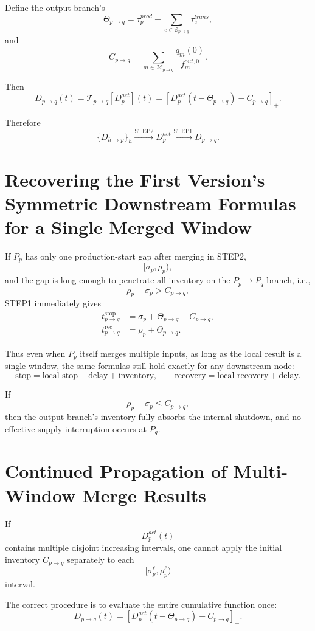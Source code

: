 \documentclass[11pt]{article}
\begin{document}
Define the output branch's
\[
\Theta_{p\to q}
=
\tau_p^{prod}
+
\sum_{e\in\mathcal E_{p\to q}}
\tau_e^{trans},
\]
and
\[
C_{p\to q}
=
\sum_{m\in\mathcal M_{p\to q}}
\frac{q_m(0)}{f_m^{out,0}}.
\]

Then
\[
\boxed{
D_{p\to q}(t)
=
\mathcal T_{p\to q}[D_p^{act}](t)
=
\left[
D_p^{act}(t-\Theta_{p\to q})
-
C_{p\to q}
\right]_+.
}
\tag{18}
\]

Therefore
\[
\boxed{
\{D_{h\to p}\}_h
\overset{\mathrm{STEP2}}{\longrightarrow}
D_p^{act}
\overset{\mathrm{STEP1}}{\longrightarrow}
D_{p\to q}.
}
\tag{19}
\]

\section{Recovering the First Version's Symmetric Downstream Formulas for a Single Merged Window}

If \(P_p\) has only one production-start gap after merging in STEP2,
\[
[\sigma_p,\rho_p),
\]
and the gap is long enough to penetrate all inventory on the \(P_p\to P_q\) branch, i.e.,
\[
\rho_p-\sigma_p>C_{p\to q},
\]
STEP1 immediately gives
\[
\boxed{
\begin{aligned}
t_{p\to q}^{\mathrm{stop}}
&=
\sigma_p
+\Theta_{p\to q}
+C_{p\to q},
\\[1mm]
t_{p\to q}^{\mathrm{rec}}
&=
\rho_p
+\Theta_{p\to q}.
\end{aligned}
}
\tag{20}
\]

Thus even when \(P_p\) itself merges multiple inputs,
as long as the local result is a single window,
the same formulas still hold exactly for any downstream node:
\[
\boxed{
\text{stop}=\text{local stop}+\text{delay}+\text{inventory},
\qquad
\text{recovery}=\text{local recovery}+\text{delay}.
}
\tag{21}
\]

If
\[
\rho_p-\sigma_p\le C_{p\to q},
\]
then the output branch's inventory fully absorbs the internal shutdown,
and no effective supply interruption occurs at \(P_q\).

\section{Continued Propagation of Multi-Window Merge Results}

If
\[
D_p^{act}(t)
\]
contains multiple disjoint increasing intervals,
one cannot apply the initial inventory \(C_{p\to q}\) separately to each
\[
[\sigma_p^\ell,\rho_p^\ell)
\]
interval.

The correct procedure is to evaluate the entire cumulative function once:
\[
\boxed{
D_{p\to q}(t)
=
[D_p^{act}(t-\Theta_{p\to q})-C_{p\to q}]_+.
}
\tag{22}
\]
\end{document}

